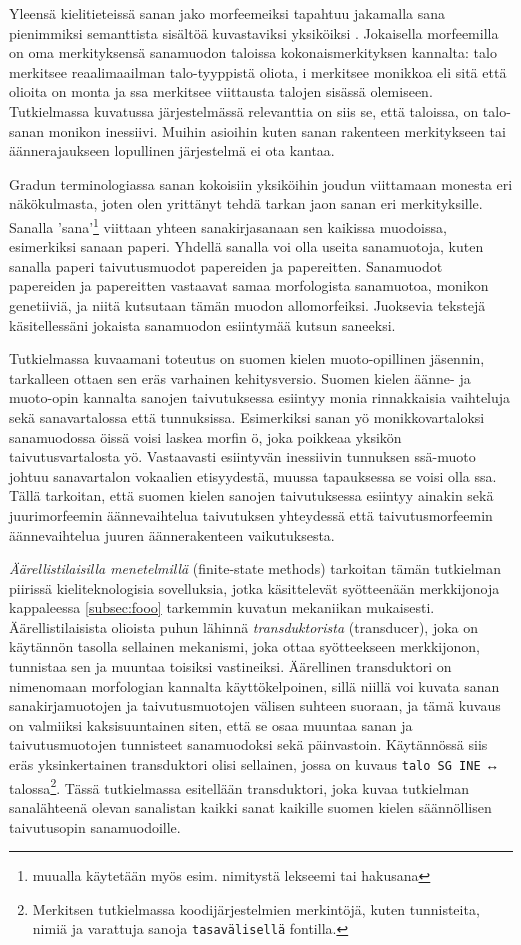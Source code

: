 \documentclass[free]{flammie}
\begin{document}
Yleensä
kielitieteissä sanan jako morfeemeiksi tapahtuu jakamalla sana pienimmiksi
semanttista sisältöä kuvastaviksi yksiköiksi \cite{karlsson1998suomen}. Jokaisella
morfeemilla on oma merkityksensä sanamuodon taloissa kokonaismerkityksen
kannalta: talo merkitsee reaalimaailman talo-tyyppistä oliota, i merkitsee
monikkoa eli sitä että olioita on monta ja ssa merkitsee viittausta talojen
sisässä olemiseen. Tutkielmassa kuvatussa järjestelmässä relevanttia on siis se,
että taloissa, on talo-sanan monikon inessiivi. Muihin asioihin kuten sanan
rakenteen merkitykseen tai äännerajaukseen lopullinen järjestelmä ei ota kantaa.

Gradun terminologiassa sanan kokoisiin yksiköihin joudun viittamaan monesta eri
näkökulmasta, joten olen yrittänyt tehdä tarkan jaon sanan eri merkityksille.
Sanalla ’sana’\footnote{muualla käytetään myös esim. nimitystä lekseemi tai
hakusana} viittaan yhteen sanakirjasanaan sen kaikissa muodoissa, esimerkiksi
sanaan paperi. Yhdellä sanalla voi olla useita sanamuotoja, kuten sanalla paperi
taivutusmuodot papereiden ja papereitten. Sanamuodot papereiden ja papereitten
vastaavat samaa morfologista sanamuotoa, monikon genetiiviä, ja niitä kutsutaan
tämän muodon allomorfeiksi. Juoksevia tekstejä käsitellessäni jokaista
sanamuodon esiintymää kutsun saneeksi.

Tutkielmassa kuvaamani toteutus
on suomen kielen muoto-opillinen jäsennin, tarkalleen ottaen sen eräs varhainen
kehitysversio. Suomen kielen äänne- ja muoto-opin kannalta sanojen taivutuksessa
esiintyy monia rinnakkaisia vaihteluja sekä sanavartalossa että tunnuksissa.
Esimerkiksi sanan yö monikkovartaloksi sanamuodossa öissä voisi laskea morfin ö,
joka poikkeaa yksikön taivutusvartalosta yö. Vastaavasti esiintyvän inessiivin
tunnuksen ssä-muoto johtuu sanavartalon vokaalien etisyydestä, muussa
tapauksessa se voisi olla ssa. Tällä tarkoitan, että suomen kielen sanojen
taivutuksessa esiintyy ainakin sekä juurimorfeemin äännevaihtelua taivutuksen
yhteydessä että taivutusmorfeemin äännevaihtelua juuren äännerakenteen
vaikutuksesta.

\textit{Äärellistilaisilla menetelmillä} (finite-state methods) tarkoitan tämän
tutkielman piirissä kieliteknologisia sovelluksia, jotka käsittelevät
syötteenään merkkijonoja kappaleessa \ref{subsec:fooo} tarkemmin kuvatun mekaniikan
mukaisesti. Äärellistilaisista olioista puhun lähinnä \textit{transduktorista}
(transducer), joka on käytännön tasolla sellainen mekanismi, joka ottaa
syötteekseen merkkijonon, tunnistaa sen ja muuntaa toisiksi vastineiksi.
Äärellinen transduktori on nimenomaan morfologian kannalta käyttökelpoinen,
sillä niillä voi kuvata sanan sanakirjamuotojen ja taivutusmuotojen välisen
suhteen suoraan, ja tämä kuvaus on valmiiksi kaksisuuntainen siten, että se osaa
muuntaa sanan ja taivutusmuotojen tunnisteet sanamuodoksi sekä päinvastoin.
Käytännössä siis eräs yksinkertainen transduktori olisi sellainen, jossa on
kuvaus \texttt{talo SG INE} ↔ talossa\footnote{Merkitsen tutkielmassa koodijärjestelmien
merkintöjä, kuten tunnisteita, nimiä ja varattuja sanoja
\texttt{tasavälisellä}
fontilla.}. Tässä tutkielmassa esitellään transduktori, joka kuvaa tutkielman
sanalähteenä olevan sanalistan kaikki sanat kaikille suomen kielen säännöllisen
taivutusopin sanamuodoille.
\end{document}
